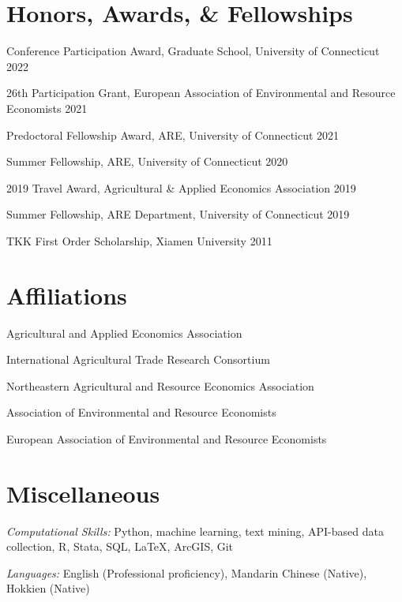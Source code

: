 \documentclass[10.8 pt,letterpaper]{article}
\renewenvironment{itemize}{
	\begin{list}{}{
			\setlength{\leftmargin}{1.5em}
		}
	}{
	\end{list}
}
\begin{document}
	\section*{\textbf{Honors, Awards, \& Fellowships}}
	\begin{itemize}
		\item[-] Conference Participation Award, Graduate School, University of Connecticut \hfill 2022
		\item[-] 26th Participation Grant, European Association of Environmental and Resource Economists \hfill 2021
		\item[-] Predoctoral Fellowship Award, ARE, University of Connecticut \hfill 2021
		\item[-] Summer Fellowship, ARE, University of Connecticut \hfill 2020
		\item[-] 2019 Travel Award, Agricultural \& Applied Economics Association  \hfill 2019
		\item[-] Summer Fellowship, ARE Department, University of Connecticut \hfill 2019
		\item[-] TKK First Order Scholarship, Xiamen University \hfill 2011
	\end{itemize}
	
	
	\section*{\textbf{Affiliations}}
	\begin{itemize}
		\item[-] Agricultural and Applied Economics Association
		\item[-] International Agricultural Trade Research Consortium
		\item[-] Northeastern Agricultural and Resource Economics Association
		\item[-] Association of Environmental and Resource Economists
		\item[-] European Association of Environmental and Resource Economists
	\end{itemize}
	
	\section*{\textbf{Miscellaneous}}
	\begin{itemize}
		
		\item[-] \textit{Computational Skills:} Python, machine learning, text mining, API-based data collection, R, Stata, SQL, \LaTeX, ArcGIS, Git
		
		\item[-] \textit{Languages:} English (Professional proficiency), Mandarin Chinese (Native), Hokkien (Native)
		
	\end{itemize}
	
\end{document}
